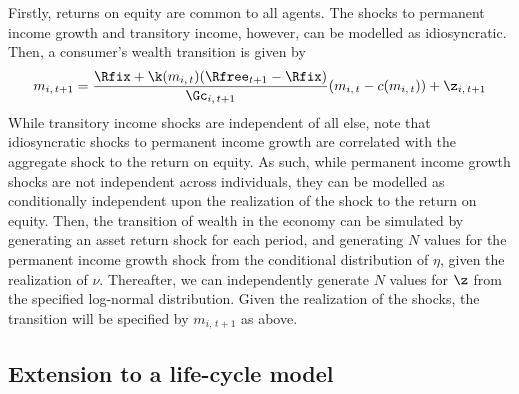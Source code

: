 Firstly, returns on equity are common to all agents. The shocks to permanent income growth and transitory income, however, can be modelled as idiosyncratic. Then, a consumer's wealth transition is given by
\[
m_{i,\,t+1} = \frac{\Rfix + \k(m_{i,\,t})(\Rfree_{t+1} - \Rfix)}{\Gc_{i,\,t+1}}(m_{i,\,t} - c(m_{i,\,t})) + \z_{i,\,t+1}
\]
While transitory income shocks are independent of all else, note that idiosyncratic shocks to permanent income growth are correlated with the aggregate shock to the return on equity. As such, while permanent income growth shocks are not independent across individuals, they can be modelled as conditionally independent upon the realization of the shock to the return on equity. Then, the transition of wealth in the economy can be simulated by generating an asset return shock for each period, and generating $N$ values for the permanent income growth shock from the conditional distribution of $\eta$, given the realization of $\nu$. Thereafter, we can independently generate $N$ values for $\z$ from the specified log-normal distribution. Given the realization of the shocks, the transition will be specified by $m_{i,\,t+1}$ as above.

\subsection{Extension to a life-cycle model}

